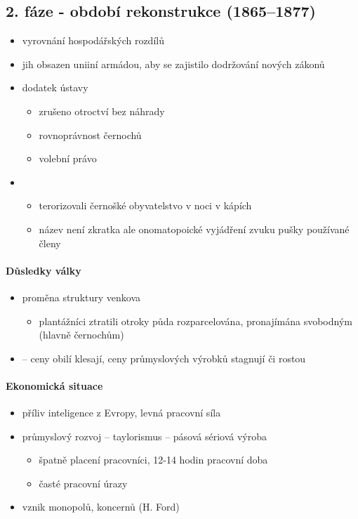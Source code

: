 \subsection{2. fáze - období rekonstrukce (1865--1877)}
\begin{itemize}
\item vyrovnání hospodářských rozdílů
\item jih obsazen uniiní armádou, aby se zajistilo dodržování nových zákonů
\item dodatek ústavy
	\begin{itemize}
	\item zrušeno otroctví bez náhrady
	\item rovnoprávnost černochů
	\item volební právo
	\end{itemize}
\item {}
	\begin{itemize}
	\item terorizovali černošké obyvatelstvo v noci v kápích
	\item název není zkratka ale onomatopoické vyjádření zvuku pušky používané členy
	\end{itemize}
\end{itemize}

\paragraph{Důsledky války}
\begin{itemize}
\item proměna struktury venkova
	\begin{itemize}
	\item plantážníci ztratili otroky \ra půda rozparcelována, pronajímána svobodným (hlavně černochům)
	\end{itemize}
\item {} -- ceny obilí klesají, ceny průmyslových výrobků stagnují či rostou
\end{itemize}

\paragraph{Ekonomická situace}
\begin{itemize}
\item příliv inteligence z Evropy, levná pracovní síla
\item průmyslový rozvoj -- taylorismus -- pásová sériová výroba
	\begin{itemize}
	\item špatně placení pracovníci, 12-14 hodin pracovní doba
	\item časté pracovní úrazy
	\end{itemize}
\item vznik monopolů, koncernů (H. Ford)

\end{itemize}

